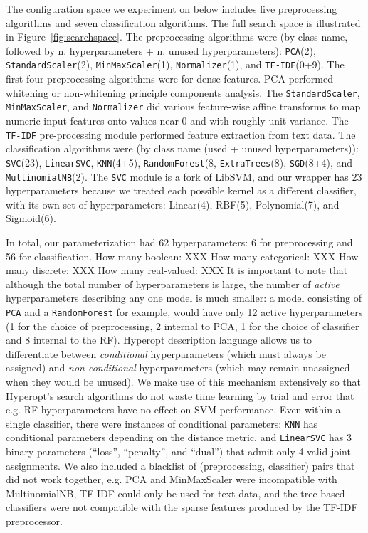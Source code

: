 \documentclass[wcp]{jmlr}
\begin{document}
The configuration space we experiment on below includes five preprocessing algorithms and seven classification algorithms.
The full search space is illustrated in Figure~\ref{fig:searchspace}.
The preprocessing algorithms were (by class name, followed by n. hyperparameters + n. unused hyperparameters): \texttt{PCA}(2), \texttt{StandardScaler}(2), \texttt{MinMaxScaler}(1), \texttt{Normalizer}(1), and \texttt{TF-IDF}(0+9).
The first four preprocessing algorithms were for dense features.
PCA performed whitening or non-whitening principle components analysis.
The \texttt{StandardScaler}, \texttt{MinMaxScaler}, and \texttt{Normalizer} did various feature-wise affine transforms to map numeric input features onto values near 0 and with roughly unit variance.
The \texttt{TF-IDF} pre-processing module performed feature extraction from text data.
The classification algorithms were (by class name (used + unused hyperparameters)): \texttt{SVC}(23), \texttt{LinearSVC}, \texttt{KNN}(4+5), \texttt{RandomForest}(8, \texttt{ExtraTrees}(8), \texttt{SGD}(8+4), and \texttt{MultinomialNB}(2).
The \texttt{SVC} module is a fork of LibSVM, and our wrapper has 23 hyperparameters because we treated each possible kernel as a different classifier, with its own set of hyperparameters: Linear(4), RBF(5), Polynomial(7), and Sigmoid(6).

In total, our parameterization had 62 hyperparameters: 6 for preprocessing and 56 for classification.
How many boolean: XXX
How many categorical: XXX
How many discrete: XXX
How many real-valued: XXX
It is important to note that although the total number of hyperparameters is large, the number of {\em active} hyperparameters describing any one model is much smaller: a model consisting of \texttt{PCA} and a \texttt{RandomForest} for example,
would have only 12 active hyperparameters (1 for the choice of preprocessing, 2 internal to PCA, 1 for the choice of classifier and 8 internal to the RF).
Hyperopt description language allows us to differentiate between {\em conditional} hyperparameters (which must always be assigned) and {\em non-conditional} hyperparameters (which may remain unassigned when they would be unused).
We make use of this mechanism extensively so that Hyperopt's search algorithms do not waste time learning by trial and error that e.g. RF hyperparameters have no effect on SVM performance.
Even within a single classifier, there were instances of conditional parameters: \texttt{KNN} has conditional parameters depending on the distance metric,
and \texttt{LinearSVC} has 3 binary parameters (``loss'', ``penalty'', and ``dual'') that admit only 4 valid joint assignments.
We also included a blacklist of (preprocessing, classifier) pairs that did not work together, e.g. PCA and MinMaxScaler were incompatible with MultinomialNB, TF-IDF could only be used for text data, and the tree-based classifiers were not
compatible with the sparse features produced by the TF-IDF preprocessor.
\end{document}
